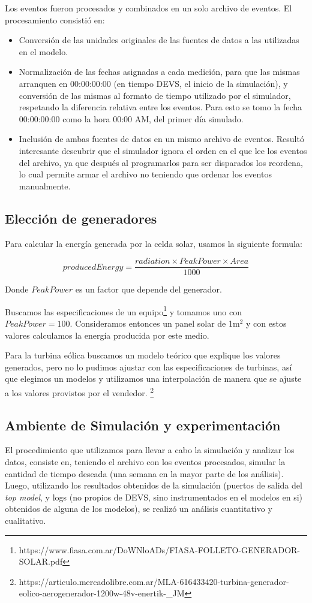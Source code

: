 Los eventos fueron procesados y combinados en un solo archivo de eventos. El
procesamiento consistió en: 
\begin{itemize} 
    \item Conversión de las unidades originales de las fuentes de datos a las
    utilizadas en el modelo.
    \item Normalización de las fechas asignadas a cada medición, para que las
    mismas arranquen en 00:00:00:00 (en tiempo DEVS, el inicio de la
    simulación), y conversión de las mismas al formato de tiempo utilizado
    por el simulador, respetando la diferencia relativa entre los eventos.
    Para esto se tomo la fecha 00:00:00:00 como la hora 00:00 AM, del primer
    día simulado.
    \item Inclusión de ambas fuentes de datos en un mismo archivo de eventos.
    Resultó interesante descubrir que el simulador ignora el orden en el que
    lee los eventos del archivo, ya que después al programarlos para ser
    disparados los reordena, lo cual permite armar el archivo no teniendo que
    ordenar los eventos manualmente.
\end{itemize} %

\subsection{Elección de generadores}
Para calcular la energía generada por la celda solar, usamos la siguiente formula:

$$producedEnergy = \frac{radiation \times PeakPower \times Area}{1000}$$

Donde $PeakPower$ es un factor que depende del generador.

Buscamos las especificaciones de un equipo\footnote{https://www.fiasa.com.ar/DoWNloADs/FIASA-FOLLETO-GENERADOR-SOLAR.pdf}  
y tomamos uno con $PeakPower=100$. Consideramos entonces un panel solar de 1m$^2$ y con estos valores calculamos la
energía producida por este medio.

Para la turbina eólica buscamos un modelo teórico que explique los valores generados,
pero no lo pudimos ajustar con las especificaciones de turbinas, así que elegimos un
modelos y utilizamos una interpolación de manera que se ajuste a los valores 
provistos por el vendedor. \footnote{https://articulo.mercadolibre.com.ar/MLA-616433420-turbina-generador-eolico-aerogenerador-1200w-48v-enertik-\_JM}

\subsection{Ambiente de Simulación y experimentación} 
El procedimiento que utilizamos para llevar a cabo la simulación y analizar
los datos, consiste en, teniendo el archivo con los eventos procesados,
simular la cantidad de tiempo deseada (una semana en la mayor parte de los
análisis). Luego, utilizando los resultados obtenidos de la simulación
(puertos de salida del \textit{top model}, y logs (no propios de DEVS, sino
instrumentados en el modelos en si) obtenidos de alguna de los modelos), se
realizó un análisis cuantitativo y cualitativo.

